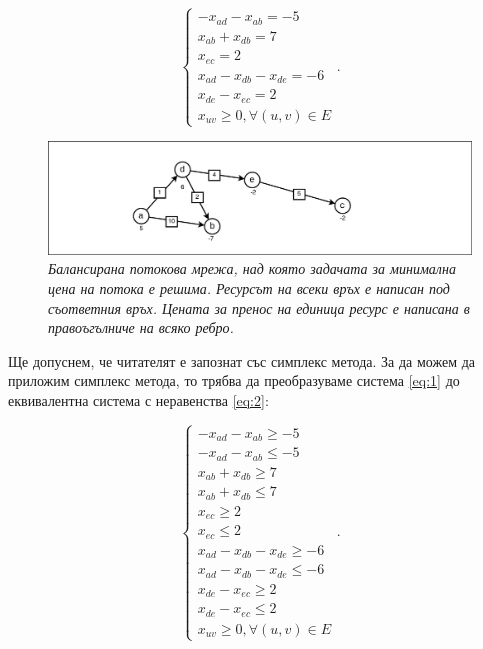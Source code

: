 \documentclass[a4paper,12pt]{article}
\begin{document}
\begin{equation}
    \label{eq:1}
    \begin{cases}
        -x_{ad} - x_{ab} = -5\\
        x_{ab} + x_{db} = 7\\
        x_{ec} = 2\\
        x_{ad} - x_{db} - x_{de} = -6\\
        x_{de} - x_{ec} = 2\\
        x_{uv} \geq 0, \forall (u, v) \in E
    \end{cases}.
\end{equation}

\begin{figure}[ht]
    \centering
    \includegraphics[width=\textwidth]{flownet1.png}
    \caption{\textit{Балансирана потокова мрежа, над която задачата за минимална цена на потока е решима. Ресурсът на всеки връх е написан под съответния връх. Цената за пренос на единица ресурс е написана в правоъгълниче на всяко ребро.}}
    \label{fig:flownet1}
\end{figure}

\bigbreak

Ще допуснем, че читателят е запознат със симплекс метода. За да можем да приложим симплекс метода, то трябва да преобразуваме система \ref{eq:1} до еквивалентна система с неравенства \ref{eq:2}:

\begin{equation}
    \label{eq:2}
    \begin{cases}
        -x_{ad} - x_{ab} \geq -5\\
        -x_{ad} - x_{ab} \leq -5\\
        x_{ab} + x_{db} \geq 7\\
        x_{ab} + x_{db} \leq 7\\
        x_{ec} \geq 2\\
        x_{ec} \leq 2\\
        x_{ad} - x_{db} - x_{de} \geq -6\\
        x_{ad} - x_{db} - x_{de} \leq -6\\
        x_{de} - x_{ec} \geq 2\\
        x_{de} - x_{ec} \leq 2\\
        x_{uv} \geq 0, \forall (u, v) \in E
    \end{cases}.
\end{equation}
\end{document}
